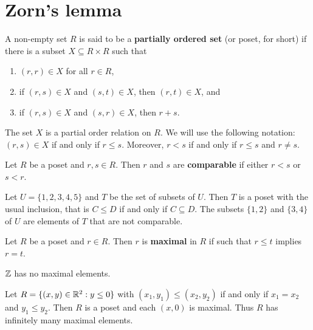 \section*{Zorn's lemma}

\begin{definition}
A non-empty set $R$ is said to be a \textbf{partially ordered set} (or poset, for short) 
if there is a subset $X\subseteq R\times R$ such that
\begin{enumerate}
    \item $(r,r)\in X$ for all $r\in R$, 
    \item if $(r,s)\in X$ and $(s,t)\in X$, then $(r,t)\in X$, and 
    \item if $(r,s)\in X$ and $(s,r)\in X$, then $r+s$. 
\end{enumerate}
\end{definition}

The set $X$ is a partial order relation on $R$.  
We will use the following notation: $(r,s)\in X$ if and only if $r\leq s$. Moreover, 
$r<s$ if and only if $r\leq s$ and $r\ne s$. 

\begin{definition}
Let $R$ be a poset and $r,s\in R$. Then $r$ and $s$ are \textbf{comparable}
if either $r<s$ or $s<r$.
\end{definition}

\begin{example}
Let $U=\{1,2,3,4,5\}$ and $T$ be the set of subsets of $U$. Then $T$ is a poset
with the usual inclusion, that is $C\leq D$ if and only if $C\subseteq D$. The subsets
$\{1,2\}$ and $\{3,4\}$ of $U$ are elements of $T$ that are not comparable. 
\end{example}

\begin{definition}
    Let $R$ be a poset and $r\in R$. Then $r$ is \textbf{maximal} in $R$ if 
    such that $r\leq t$ implies $r=t$. 
\end{definition}

\begin{example}
$\mathbb{Z}$ has no maximal elements. 
\end{example}

\begin{example}
Let $R=\{(x,y)\in\mathbb{R}^2:y\leq0\}$ with $(x_1,y_1)\leq(x_2,y_2)$ if and only if $x_1=x_2$ and $y_1\leq y_2$. Then
$R$ is a poset and each $(x,0)$ is maximal. Thus $R$ has infinitely many maximal elements.
\end{example}

